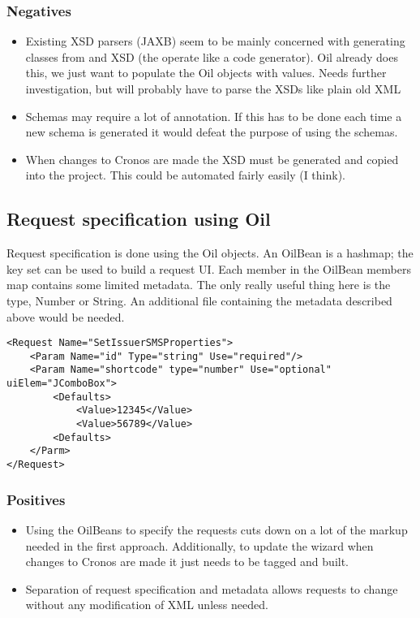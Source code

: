 \documentclass[a4paper,12pt, titlepage]{article}
\begin{document}
		\subsubsection{Negatives}
		\begin{itemize}
		\item Existing XSD parsers (JAXB) seem to be mainly concerned with generating classes from and XSD (the operate like a code generator). Oil already does this, we just want to populate the Oil objects with values. Needs further investigation, but will probably have to parse the XSDs like plain old XML
		\item Schemas may require a lot of annotation. If this has to be done each time a new schema is generated it would defeat the purpose of using the schemas.
		\item When changes to Cronos are made the XSD must be generated and copied into the project. This could be automated fairly easily (I think).
		\end{itemize}
	\subsection{Request specification using Oil}
Request specification is done using the Oil objects. An OilBean is a hashmap; the key set can be used to build a request UI. Each member in the OilBean members map contains some limited metadata. The only really useful thing here is the type, Number or String. An additional file containing the metadata described above would be needed.
	\begin{verbatim}
<Request Name="SetIssuerSMSProperties">
    <Param Name="id" Type="string" Use="required"/>
    <Param Name="shortcode" type="number" Use="optional" uiElem="JComboBox">
        <Defaults>
            <Value>12345</Value>
            <Value>56789</Value>
        <Defaults>
    </Parm>
</Request>

	\end{verbatim}

		\subsubsection{Positives}
		\begin{itemize}
		\item Using the OilBeans to specify the requests cuts down on a lot of the markup needed in the first approach. Additionally, to update the wizard when changes to Cronos are made it just needs to be tagged and built.
		\item Separation of request specification and metadata allows requests to change without any modification of XML unless needed.
		\end{itemize}
\end{document}

